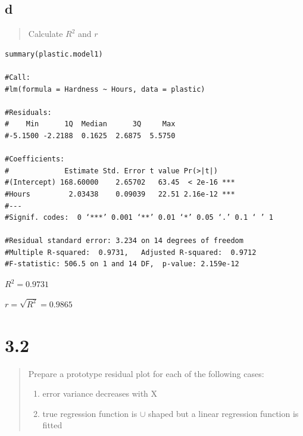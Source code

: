 \documentclass[11pt]{article}
\begin{document}
\subsection{d}
\label{sec:orgc6eec37}
\begin{quote}
Calculate \(R^2\) and \(r\)
\end{quote}


\begin{verbatim}
summary(plastic.model1)

#Call:
#lm(formula = Hardness ~ Hours, data = plastic)

#Residuals:
#    Min      1Q  Median      3Q     Max
#-5.1500 -2.2188  0.1625  2.6875  5.5750

#Coefficients:
#             Estimate Std. Error t value Pr(>|t|)
#(Intercept) 168.60000    2.65702   63.45  < 2e-16 ***
#Hours         2.03438    0.09039   22.51 2.16e-12 ***
#---
#Signif. codes:  0 ‘***’ 0.001 ‘**’ 0.01 ‘*’ 0.05 ‘.’ 0.1 ‘ ’ 1

#Residual standard error: 3.234 on 14 degrees of freedom
#Multiple R-squared:  0.9731,	Adjusted R-squared:  0.9712
#F-statistic: 506.5 on 1 and 14 DF,  p-value: 2.159e-12
\end{verbatim}



\(R^2 = 0.9731\)

\(r = \sqrt{R^2} = 0.9865\)
\section{3.2}
\label{sec:orgb4f023f}
\begin{quote}
Prepare a prototype residual plot for each of the following cases:
\begin{enumerate}
\item error variance decreases with X
\item true regression function is \(\cup\) shaped but a linear regression function
is fitted
\end{enumerate}
\end{quote}
\end{document}
